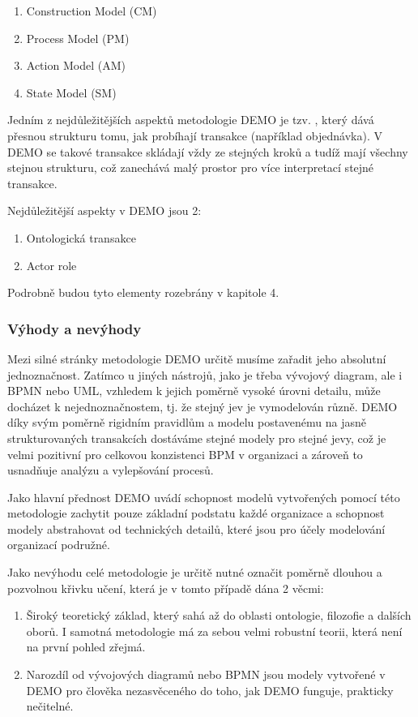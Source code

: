 \documentclass[]{article}
\begin{document}
\begin{enumerate}
\item Construction Model (CM)
\item Process Model (PM)
\item Action Model (AM)
\item State Model (SM)
\end{enumerate}

Jedním z nejdůležitějších aspektů metodologie DEMO je tzv. , který dává přesnou strukturu tomu, jak probíhají transakce (například objednávka). V DEMO se takové transakce skládají vždy ze stejných kroků a tudíž mají všechny stejnou strukturu, což zanechává malý prostor pro více interpretací stejné transakce.

Nejdůležitější aspekty v DEMO jsou 2:

\begin{enumerate}
\item Ontologická transakce
\item Actor role
\end{enumerate}

Podrobně budou tyto elementy rozebrány v kapitole 4. %


\subsubsection{Výhody a nevýhody}
Mezi silné stránky metodologie DEMO určitě musíme zařadit jeho absolutní jednoznačnost. Zatímco u jiných nástrojů, jako je třeba vývojový diagram, ale i BPMN nebo UML, vzhledem k jejich poměrně vysoké úrovni detailu, může docházet k nejednoznačnostem, tj. že stejný jev je vymodelován různě. DEMO díky svým poměrně rigidním pravidlům a modelu postavenému na jasně strukturovaných transakcích dostáváme stejné modely pro stejné jevy, což je velmi pozitivní pro celkovou konzistenci BPM v organizaci a zároveň to usnadňuje analýzu a vylepšování procesů.

Jako hlavní přednost DEMO uvádí \cite{Barjis2011} schopnost modelů vytvořených pomocí této metodologie zachytit pouze základní podstatu každé organizace a schopnost modely abstrahovat od technických detailů, které jsou pro účely modelování organizací podružné.

Jako nevýhodu celé metodologie je určitě nutné označit poměrně dlouhou a pozvolnou křivku učení, která je v tomto případě dána 2 věcmi:

\begin{enumerate}
\item Široký teoretický základ, který sahá až do oblasti ontologie, filozofie a dalších oborů. I samotná metodologie má za sebou velmi robustní teorii, která není na první pohled zřejmá.
\item Narozdíl od vývojových diagramů nebo BPMN jsou modely vytvořené v DEMO pro člověka nezasvěceného do toho, jak DEMO funguje, prakticky nečitelné.
\end{enumerate}
\end{document}
